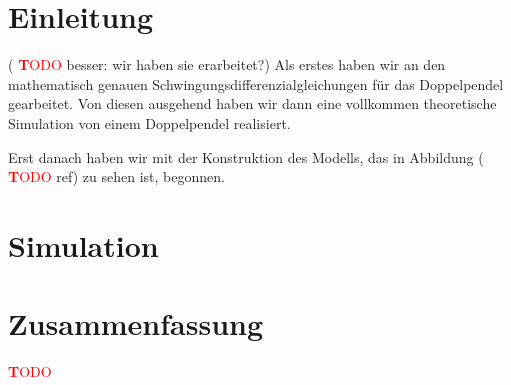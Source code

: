 \documentclass[a4paper, 10pt]{article}
\title{\mytitle}
\author{\myauthor}
\newcommand{\TODO}{\textcolor{red}{ \textbf TODO }}
\begin{document}
\maketitle
\begin{abstract}
In unserem Projekt beschäftigen wir uns mit dem Verhalten von chaotischen Doppelpendeln. Wir wollen aus der aktuellen Bewegung eines Doppelpendels den weiteren Bewegungsablauf in einem kurzen Zeitintervall extrapolieren und dann versuchen, diese Bewegung zu beeinflussen.

Hierzu wollen wir zunächst ein Doppelpendel konstruieren, bei dem Daten über den aktuellen Bewegungszustand erfasst werden können. Diese Daten sollen in Echtzeit von einem Computer ausgewertet werden, um laufend eine Prognose an die Messwerte anzupassen. Anhand dieser Prognose soll dann entschieden werden, ob das Pendel eine unerwünschte Bewegung durchführen wird, und wenn nötig, soll mithilfe mehrerer Spulen eine korrigierende magnetische Kraft erzeugt werden. Es könnte zum Beispiel erwünscht sein, einen Überschlag zu vermeiden.
\end{abstract}

\clearpage
\pagestyle{fancy}
\tableofcontents

\clearpage

\section{Einleitung}
(\TODO besser: wir haben sie erarbeitet?)
Als erstes haben wir an den mathematisch genauen Schwingungsdifferenzialgleichungen für das Doppelpendel gearbeitet.
Von diesen ausgehend haben wir dann eine vollkommen theoretische Simulation von einem Doppelpendel realisiert.

Erst danach haben wir mit der Konstruktion des Modells, das in Abbildung (\TODO ref) zu sehen ist, begonnen.

\section{Simulation}


\clearpage


\section{Zusammenfassung}
\TODO

\vfill
{}

{}
\end{document}
